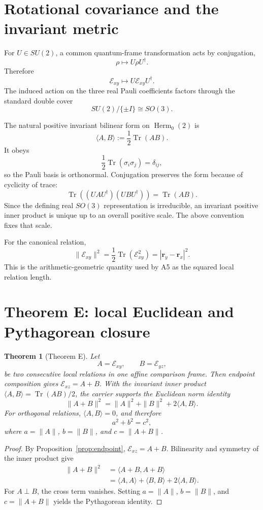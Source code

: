 \documentclass[12pt,a4paper]{article}
\newtheorem{theorem}{Theorem}[section]
\newcommand{\Herm}{\operatorname{Herm}}
\newcommand{\Tr}{\operatorname{Tr}}
\newcommand{\Erel}{\mathcal{E}}
\newcommand{\rvec}{\bm{r}}
\begin{document}
\section{Rotational covariance and the invariant metric}

For $U\in SU(2)$, a common quantum-frame transformation acts by conjugation,
\[
\rho\mapsto U\rho U^\dagger.
\]
Therefore
\[
\boxed{\Erel_{xy}\mapsto U\Erel_{xy}U^\dagger.}
\]
The induced action on the three real Pauli coefficients factors through the standard double cover
\[
\boxed{SU(2)/\{\pm I\}\cong SO(3).}
\]

The natural positive invariant bilinear form on $\Herm_0(2)$ is
\[
\boxed{\langle A,B\rangle:=\frac12\Tr(AB).}
\]
It obeys
\[
\frac12\Tr(\sigma_i\sigma_j)=\delta_{ij},
\]
so the Pauli basis is orthonormal. Conjugation preserves the form because of cyclicity of trace:
\[
\Tr\left((UAU^\dagger)(UBU^\dagger)\right)=\Tr(AB).
\]
Since the defining real $SO(3)$ representation is irreducible, an invariant positive inner product is unique up to an overall positive scale. The above convention fixes that scale.

For the canonical relation,
\[
\boxed{
\|\Erel_{xy}\|^2
=\frac12\Tr(\Erel_{xy}^2)
=|\rvec_y-\rvec_x|^2.
}
\]
This is the arithmetic-geometric quantity used by A5 as the squared local relation length.

\section{Theorem E: local Euclidean and Pythagorean closure}

\begin{theorem}[Theorem E]\label{thm:pyth}
Let
\[
A=\Erel_{xy},\qquad B=\Erel_{yz},
\]
be two consecutive local relations in one affine comparison frame. Then endpoint composition gives $\Erel_{xz}=A+B$. With the invariant inner product $\langle A,B\rangle=\Tr(AB)/2$, the carrier supports the Euclidean norm identity
\[
\|A+B\|^2=\|A\|^2+\|B\|^2+2\langle A,B\rangle.
\]
For orthogonal relations, $\langle A,B\rangle=0$, and therefore
\[
\boxed{a^2+b^2=c^2},
\]
where $a=\|A\|$, $b=\|B\|$, and $c=\|A+B\|$.
\end{theorem}

\begin{proof}
By Proposition~\ref{prop:endpoint}, $\Erel_{xz}=A+B$. Bilinearity and symmetry of the inner product give
\begin{align*}
\|A+B\|^2
&=\langle A+B,A+B\rangle\\
&=\langle A,A\rangle+\langle B,B\rangle+2\langle A,B\rangle.
\end{align*}
For $A\perp B$, the cross term vanishes. Setting $a=\|A\|$, $b=\|B\|$, and $c=\|A+B\|$ yields the Pythagorean identity.
\end{proof}
\end{document}
